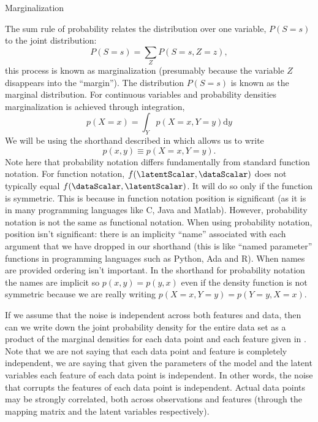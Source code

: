 \begin{boxfloat}
  \caption{Marginalization}\label{box:marginalization}

  \boxfontsize
  The sum rule of probability relates the distribution over one variable, $P(S=s)$ to the joint distribution:
  \[
  P(S=s) = \sum_Z P(S=s, Z=z),
  \]
  this process is known as marginalization (presumably because the variable $Z$ disappears into the ``margin''). The distribution $P(S=s)$ is known as the marginal distribution. For continuous variables and probability densities marginalization is achieved through integration,
  \[
  p(X=x) = \int_Y p(X=x, Y=y) \text{d}y
  \]
  We will be using the shorthand described in 
  which allows us to write
  \[
  p(x, y) \equiv p(X=x, Y=y).
  \]
  Note here that probability notation differs fundamentally from
  standard function notation. For function notation, $f(\latentScalar,
  \dataScalar)$ does not typically equal $f(\dataScalar,
  \latentScalar)$. It will do so only if the function is symmetric. This
  is because in function notation position is significant (as it is in
  many programming languages like C, Java and Matlab). However,
  probability notation is not the same as functional notation. When
  using probability notation, position isn't significant: there is an
  implicity ``name'' associated with each argument that we have dropped
  in our shorthand (this is like ``named parameter'' functions in
  programming languages such as Python, Ada and R). When names are
  provided ordering isn't important. In the shorthand for probability
  notation the names are implicit so $p(x,y) = p(y,x)$ even if the
  density function is not symmetric because we are really writing
  $p(X=x, Y=y) = p(Y=y, X=x)$.
\end{boxfloat}
% 
If we assume that the noise is independent across both features and
data, then can we write down the joint probability density for the
entire data set as a product of the marginal densities for each data
point and each feature given in . Note that
we are not saying that each data point and feature is completely
independent, we are saying that given the parameters of the model and
the latent variables each feature of each data point is
independent. In other words, the noise that corrupts the features of
each data point is independent. Actual data points may be strongly
correlated, both across observations and features (through the mapping
matrix and the latent variables respectively).  

